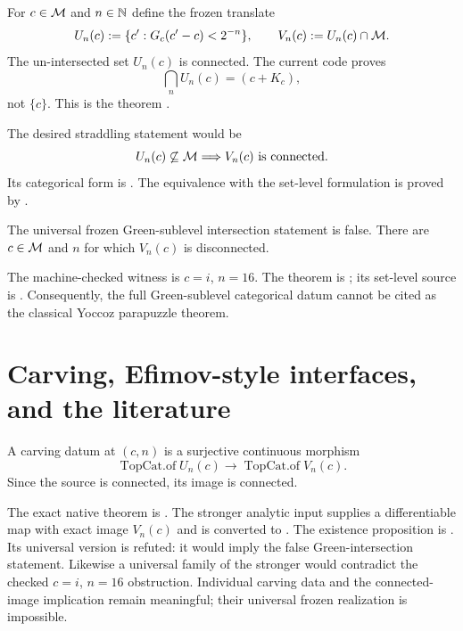 For $c\in\mathcal M$ and $n\in\mathbb N$ define the frozen translate
\[
 U_n(c):=\{c':G_c(c'-c)<2^{-n}\},
\qquad
 V_n(c):=U_n(c)\cap\mathcal M.
\]
The un-intersected set $U_n(c)$ is connected.  The current code proves
\[
 \bigcap_n U_n(c)=(c+K_c),
\]
not $\{c\}$.  This is the theorem
.

The desired straddling statement would be
\[
 U_n(c)\not\subseteq\mathcal M
\Longrightarrow V_n(c)\text{ is connected}.
\]
Its categorical form is
.
The equivalence with the set-level formulation is proved by
.

\begin{theorem}
\label{thm:frozen-sublevel-obstruction}
The universal frozen Green-sublevel intersection statement is false.  There
are $c\in\mathcal M$ and $n$ for which $V_n(c)$ is disconnected.
\end{theorem}

The machine-checked witness is $c=i$, $n=16$.  The theorem is
; its set-level source is
.
Consequently, the full Green-sublevel categorical datum cannot be cited as
the classical Yoccoz parapuzzle theorem.

\section{Carving, Efimov-style interfaces, and the literature}

\begin{definition}
\label{def:categorical-carving}
A carving datum at $(c,n)$ is a surjective continuous morphism
\[
 \operatorname{TopCat.of}U_n(c)\longrightarrow
 \operatorname{TopCat.of}V_n(c).
\]
Since the source is connected, its image is connected.
\end{definition}

The exact native theorem is
.
The stronger analytic input
 supplies a differentiable map
with exact image $V_n(c)$ and is converted to
.
The existence proposition is
.
Its universal version is refuted: it would imply the false
Green-intersection statement.  Likewise a universal family of the
stronger  would contradict the
checked $c=i$, $n=16$ obstruction.  Individual carving data and
the connected-image implication remain meaningful; their universal
frozen realization is impossible.


